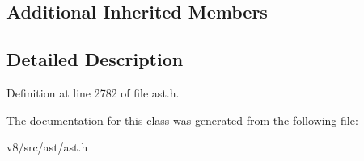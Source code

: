 \subsection*{Additional Inherited Members}


\subsection{Detailed Description}


Definition at line 2782 of file ast.\+h.



The documentation for this class was generated from the following file\+:\begin{DoxyCompactItemize}
\item 
v8/src/ast/ast.\+h\end{DoxyCompactItemize}
